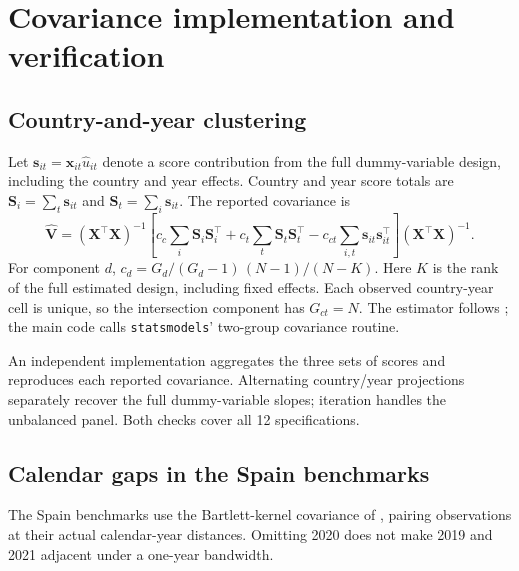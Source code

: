 \documentclass[11pt,letterpaper]{article}
\begin{document}
\clearpage
\section{Covariance implementation and verification}\label{app:inference}
\subsection{Country-and-year clustering}
Let $\mathbf s_{it}=\mathbf x_{it}\widehat u_{it}$ denote a score contribution from the full dummy-variable design, including the country and year effects. Country and year score totals are $\mathbf S_i=\sum_t\mathbf s_{it}$ and $\mathbf S_t=\sum_i\mathbf s_{it}$. The reported covariance is
\begin{equation}\label{eq:cluster}
\widehat{\mathbf V}=(\mathbf X^{\top}\mathbf X)^{-1}
\left[c_c\sum_i\mathbf S_i\mathbf S_i^{\top}
+c_t\sum_t\mathbf S_t\mathbf S_t^{\top}
-c_{ct}\sum_{i,t}\mathbf s_{it}\mathbf s_{it}^{\top}\right]
(\mathbf X^{\top}\mathbf X)^{-1}.
\end{equation}
For component $d$, $c_d=G_d/(G_d-1)\,(N-1)/(N-K)$. Here $K$ is the rank of the full estimated design, including fixed effects. Each observed country-year cell is unique, so the intersection component has $G_{ct}=N$. The estimator follows \citet{cameron2011}; the main code calls \texttt{statsmodels}' two-group covariance routine.

An independent implementation aggregates the three sets of scores and reproduces each reported covariance. Alternating country/year projections separately recover the full dummy-variable slopes; iteration handles the unbalanced panel. Both checks cover all 12 specifications.

\subsection{Calendar gaps in the Spain benchmarks}
The Spain benchmarks use the Bartlett-kernel covariance of \citet{newey1987}, pairing observations at their actual calendar-year distances. Omitting 2020 does not make 2019 and 2021 adjacent under a one-year bandwidth.
\end{document}
